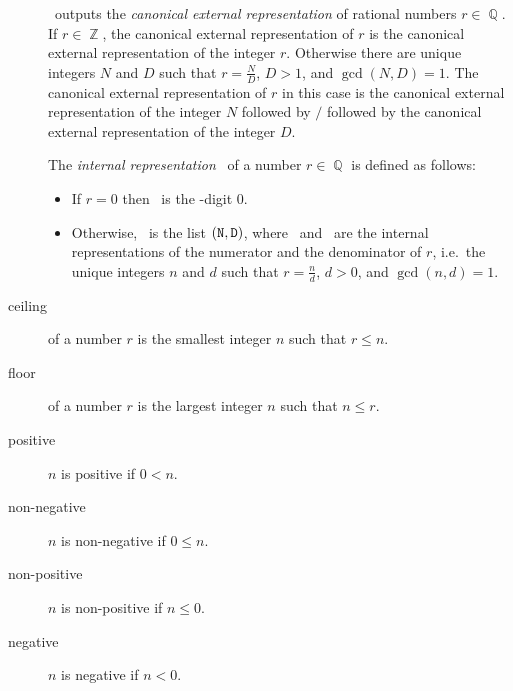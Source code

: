 \begin{description}
  \saclib\ outputs the {\em canonical external representation} of rational numbers
  $r \in \BbbQ$.
  If $r \in \BbbZ$, the canonical external representation of $r$ is the canonical
  external representation of the integer $r$.
  Otherwise there are unique integers $N$ and $D$ such that
  $r = \frac{N}{D}$,
  $D > 1$, and
  $\gcd(N,D) = 1$.
  The canonical external representation of $r$ in this case is the canonical external
  representation of the integer $N$ followed by $/$ followed by the canonical
  external representation of the integer $D$.

  The {\em internal representation} \ttR\ of a number $r \in \BbbQ$ is defined as
  follows:
  \begin{itemize}
  \item
    If $r = 0$ then \ttR\ is the \BETA-digit 0.
  \item
    Otherwise, \ttR\ is the list $({\tt N},{\tt D})$, where \ttN\ and \ttD\ are the
    internal representations of the numerator and the denominator of $r$,
    i.e.\ the unique integers $n$ and $d$ such that $r = \frac{n}{d}$, $d >
    0$, and $\gcd(n,d) = 1$.
  \end{itemize}
\item[ceiling]
  of a number $r$ is the smallest integer $n$ such that $r \leq n$.
\item[floor]
  of a number $r$ is the largest integer $n$ such that $n \leq r$.
\item[positive]
  $n$ is positive if $0 < n$.
\item[non-negative]
  $n$ is non-negative if $0 \leq n$.
\item[non-positive]
  $n$ is non-positive if $n \leq 0$.
\item[negative]
  $n$ is negative if $n < 0$.

\end{description}

